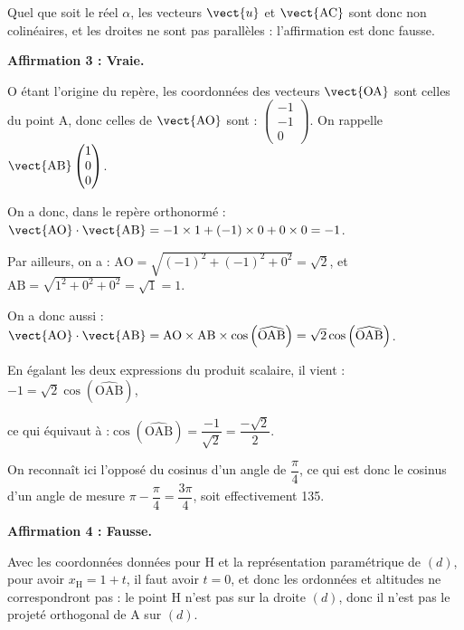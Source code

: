 Quel que soit le réel $\alpha$, les vecteurs $ \vect{u} $ et $ \vect{\mathrm{AC}} $ sont donc non colinéaires, et les droites ne sont pas parallèles : l'affirmation est donc fausse.

\medskip

\textbf{Affirmation 3 : Vraie.}

O étant l'origine du repère, les coordonnées des vecteurs $ \vect{\mathrm{OA}} $ sont celles du point A, donc celles de $ \vect{\mathrm{AO}} $ sont : $ \begin{pmatrix}-1\\-1\\0\end{pmatrix}$. On rappelle $ \vect{\mathrm{AB}}\begin{pmatrix} 1 \\ 0 \\ 0\end{pmatrix} $.

On a donc, dans le repère orthonormé : \quad$ \vect{\mathrm{AO}} \cdot \vect{\mathrm{AB}} = -1 \times 1 + (-1) \times 0 + 0 \times 0 = -1$.

Par ailleurs, on a : \quad $ \mathrm{AO} = \sqrt{(-1)^2 + (-1)^2 + 0^2} = \sqrt{2} $, \quad et \quad $ \mathrm{AB} = \sqrt{1^2 + 0^2 + 0^2} = \sqrt{1} = 1$.

On a donc aussi : \quad $ \vect{\mathrm{AO}} \cdot \vect{\mathrm{AB}} = \mathrm{AO} \times \mathrm{AB} \times \cos \left( \widehat{\mathrm{OAB}}\right) = \sqrt{2} \cos \left( \widehat{\mathrm{OAB}}\right)$.

En égalant les deux expressions du produit scalaire, il vient :
\quad $-1 = \sqrt{2}\cos \left(\widehat{\mathrm{OAB}}\right)$,

ce qui équivaut à :\quad $\cos \left(\widehat{\mathrm{OAB}}\right) = \dfrac{-1}{\sqrt{2}} = \dfrac{-\sqrt{2}}{2}$.

On reconnaît ici l'opposé du cosinus d'un angle de $ \dfrac{\pi}{4} $, ce qui est donc le cosinus d'un angle de mesure $\pi - \dfrac{\pi}{4} = \dfrac{3\pi}{4}$, soit effectivement 135\degres.

\medskip

\textbf{Affirmation 4 : Fausse.}

Avec les coordonnées données pour H et la représentation paramétrique de $(d)$, pour avoir $x_\mathrm{H} = 1 + t$, il faut avoir $t = 0$, et donc les ordonnées et altitudes ne correspondront pas : le point H n'est pas sur la droite $(d)$, donc il n'est pas le projeté orthogonal de A sur $(d)$.

